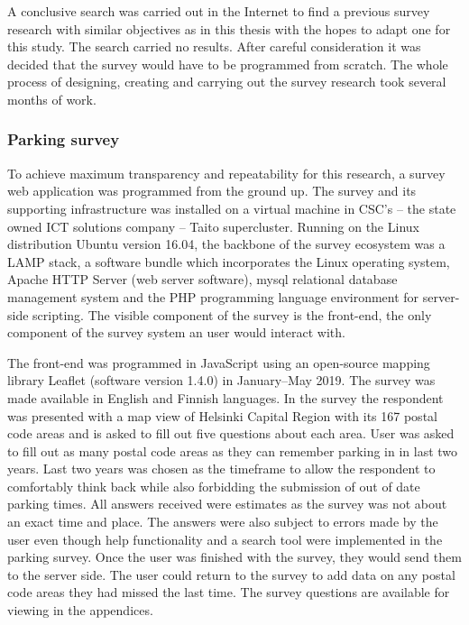 A conclusive search was carried out in the Internet to find a previous survey research with similar objectives as in this thesis with the hopes to adapt one for this study. The search carried no results. After careful consideration it was decided that the survey would have to be programmed from scratch. The whole process of designing, creating and carrying out the survey research took several months of work.

\subsubsection{Parking survey}
\justify
To achieve maximum transparency and repeatability for this research, a survey web application was programmed from the ground up. The survey and its supporting infrastructure was installed on a virtual machine in CSC's -- the state owned ICT solutions company -- Taito supercluster. Running on the Linux distribution Ubuntu version 16.04, the backbone of the survey ecosystem was a LAMP stack, a software bundle which incorporates the Linux operating system, Apache HTTP Server (web server software), \gls{mysql} relational database management system and the PHP programming language environment for server-side scripting. The visible component of the survey is the front-end, the only component of the survey system an user would interact with.

The front-end was programmed in JavaScript using an open-source mapping library Leaflet (software version 1.4.0) in January--May 2019. The survey was made available in English and Finnish languages. In the survey the respondent was presented with a map view of Helsinki Capital Region with its 167 postal code areas and is asked to fill out five questions about each area. User was asked to fill out as many postal code areas as they can remember parking in in last two years. Last two years was chosen as the timeframe to allow the respondent to comfortably think back while also forbidding the submission of out of date parking times. All answers received were estimates as the survey was not about an exact time and place. The answers were also subject to errors made by the user even though help functionality and a search tool were implemented in the parking survey. Once the user was finished with the survey, they would send them to the server side. The user could return to the survey to add data on any postal code areas they had missed the last time. The survey questions are available for viewing in the appendices.

